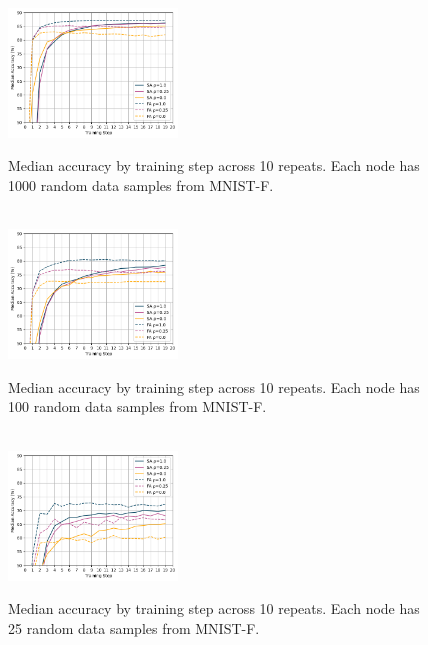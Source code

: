 \documentclass[letterpaper, 10 pt, conference]{ieeeconf}  %
\begin{document}
\begin{figure}[H]
	 \\
	\includegraphics[width=0.4\textwidth]{conf_sparse_ns1000}
	\caption{Median accuracy by training step across 10 repeats. Each node has 1000 random data samples from MNIST-F.}
	\label{aeg4}
\end{figure}

\begin{figure}[H] 
	 \\
	\includegraphics[width=0.4\textwidth]{conf_sparse_ns100}
	\caption{Median accuracy by training step across 10 repeats. Each node has 100 random data samples from MNIST-F.}
	\label{aeg5}
\end{figure}

\begin{figure}[H] 
	 \\
	\includegraphics[width=0.4\textwidth]{conf_sparse_ns25}
	\caption{Median accuracy by training step across 10 repeats. Each node has 25 random data samples from MNIST-F.}
	\label{aeg6}
\end{figure}
\end{document}
